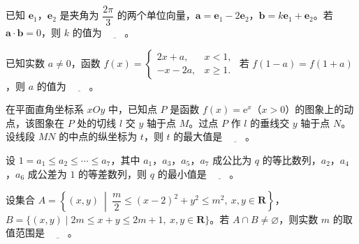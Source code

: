 \begin{question}
已知 $\boldsymbol e_1$，$\boldsymbol e_2$ 是夹角为 $\dfrac{2\pi}3$ 的两个单位向量，$\boldsymbol a=\boldsymbol e_1-2\boldsymbol e_2$，$\boldsymbol b=k\boldsymbol e_1+\boldsymbol e_2$。若 $\boldsymbol a\cdot\boldsymbol b=0$，则 $k$ 的值为 $\underline{\qquad}$。

\end{question}
\begin{question}
已知实数 $a\neq0$，函数 $f(x)=\begin{cases}2x+a,&x<1,\\-x-2a,&x\geqslant1.\end{cases}$ 若 $f(1-a)=f(1+a)$，则 $a$ 的值为 $\underline{\qquad}$。

\end{question}
\begin{question}
在平面直角坐标系 $xOy$ 中，已知点 $P$ 是函数 $f(x)=\mathrm e^x$（$x>0$）的图象上的动点，该图象在 $P$ 处的切线 $l$ 交 $y$ 轴于点 $M$。过点 $P$ 作 $l$ 的垂线交 $y$ 轴于点 $N$。设线段 $MN$ 的中点的纵坐标为 $t$，则 $t$ 的最大值是 $\underline{\qquad}$。

\end{question}
\begin{question}
设 $1=a_1\leqslant a_2\leqslant\cdots\leqslant a_7$，其中 $a_1$，$a_3$，$a_5$，$a_7$ 成公比为 $q$ 的等比数列，$a_2$，$a_4$，$a_6$ 成公差为 $1$ 的等差数列，则 $q$ 的最小值是 $\underline{\qquad}$。

\end{question}
\begin{question}
设集合 $A=\left\{(x,y)\ \middle|\ \dfrac m2\leqslant(x-2)^2+y^2\leqslant m^2,\ x,y\in\mathbf R\right\}$，$B=\{(x,y)\mid 2m\leqslant x+y\leqslant2m+1,\ x,y\in\mathbf R\}$。若 $A\cap B\neq\varnothing$，则实数 $m$ 的取值范围是 $\underline{\qquad}$。

\end{question}


